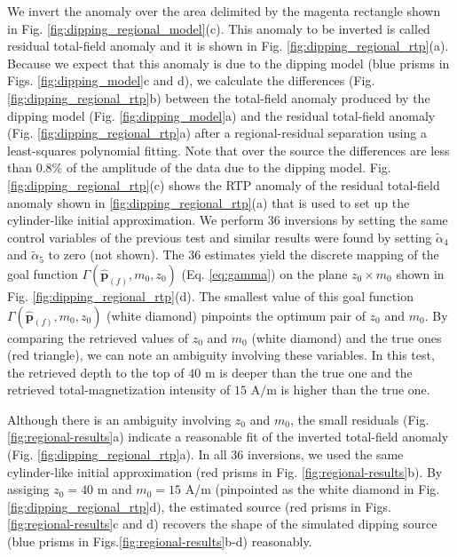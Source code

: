 We invert the anomaly over the area delimited by the magenta rectangle shown in Fig. \ref{fig:dipping_regional_model}(c).
This anomaly to be inverted is called residual total-field anomaly and it is shown in 
Fig. \ref{fig:dipping_regional_rtp}(a).
Because we expect that this anomaly is due to the dipping model (blue prisms in Figs. \ref{fig:dipping_model}c and d), we calculate the 
differences (Fig. \ref{fig:dipping_regional_rtp}b) between the total-field anomaly produced by the dipping model (Fig. \ref{fig:dipping_model}a) and the residual total-field anomaly 
(Fig. \ref{fig:dipping_regional_rtp}a) after a regional-residual separation using a least-squares polynomial fitting. 
Note that over the source the differences are less than $ 0.8\%$ of the amplitude of the data due to the dipping model.
Fig. \ref{fig:dipping_regional_rtp}(c) shows the RTP anomaly of the residual total-field anomaly shown in \ref{fig:dipping_regional_rtp}(a) that is used to set up the 
cylinder-like initial approximation.
We perform $ 36 $ inversions by setting the same control variables of the previous test and similar results were found by setting $\tilde{\alpha}_4$ and $\tilde{\alpha}_5$ to zero (not shown).
The $ 36 $ estimates yield the discrete mapping of the goal function $\Gamma (\hat{\mathbf{p}}_{(f)}, m_{0}, z_{0})$ (Eq. \ref{eq:gamma}) 
on the plane $z_0 \times m_0 $ shown in Fig. \ref{fig:dipping_regional_rtp}(d).
The smallest value of this goal function $\Gamma (\hat{\mathbf{p}}_{(f)}, m_{0}, z_{0})$ (white diamond) pinpoints 
the optimum pair of $z_0$ and $m_0$.
By comparing the retrieved values of $z_0$ and $m_0$ (white diamond) and
the true ones (red triangle), we can note an ambiguity involving these variables.
In this test, the retrieved depth to the top of $ 40 $ m is deeper than the true one and the 
retrieved total-magnetization intensity of $ 15 $ A/m is higher than the true one.

Although there is an ambiguity involving $z_0$ and $m_0$, the small residuals (Fig. \ref{fig:regional-results}a) indicate a reasonable fit of the inverted total-field anomaly
(Fig. \ref{fig:dipping_regional_rtp}a).
In all 36 inversions, we used the same cylinder-like initial approximation (red prisms in Fig. \ref{fig:regional-results}b).
By assiging $z_0 = 40$ m and $m_0 = 15$ A/m (pinpointed as the white diamond in Fig. \ref{fig:dipping_regional_rtp}d), the estimated source (red prisms in Figs.\ref{fig:regional-results}c and d) recovers the shape of the simulated dipping source 
(blue prisms in Figs.\ref{fig:regional-results}b-d) reasonably.

